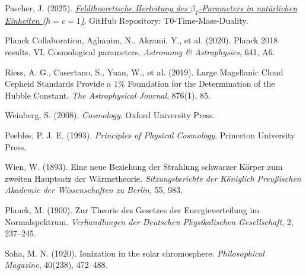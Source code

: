 \documentclass[12pt,a4paper]{article}
\begin{document}
	\begin{thebibliography}{99}
		Pascher, J. (2025). \href{https://github.com/jpascher/T0-Time-Mass-Duality/blob/main/2/pdf/DerivationVonBetaEn.pdf}{\textit{Feldtheoretische Herleitung des $\beta_T$-Parameters in natürlichen Einheiten ($\hbar = c = 1$)}}. GitHub Repository: T0-Time-Mass-Duality.
		
		Planck Collaboration, Aghanim, N., Akrami, Y., et al. (2020). Planck 2018 results. VI. Cosmological parameters. \textit{Astronomy \& Astrophysics}, 641, A6.
		
		Riess, A. G., Casertano, S., Yuan, W., et al. (2019). Large Magellanic Cloud Cepheid Standards Provide a 1\% Foundation for the Determination of the Hubble Constant. \textit{The Astrophysical Journal}, 876(1), 85.
		
		Weinberg, S. (2008). \textit{Cosmology}. Oxford University Press.
		
		Peebles, P. J. E. (1993). \textit{Principles of Physical Cosmology}. Princeton University Press.
		
		Wien, W. (1893). Eine neue Beziehung der Strahlung schwarzer Körper zum zweiten Hauptsatz der Wärmetheorie. \textit{Sitzungsberichte der Königlich Preußischen Akademie der Wissenschaften zu Berlin}, 55, 983.
		
		Planck, M. (1900). Zur Theorie des Gesetzes der Energieverteilung im Normalspektrum. \textit{Verhandlungen der Deutschen Physikalischen Gesellschaft}, 2, 237--245.
		
		Saha, M. N. (1920). Ionization in the solar chromosphere. \textit{Philosophical Magazine}, 40(238), 472--488.
	\end{thebibliography}
	
\end{document}
